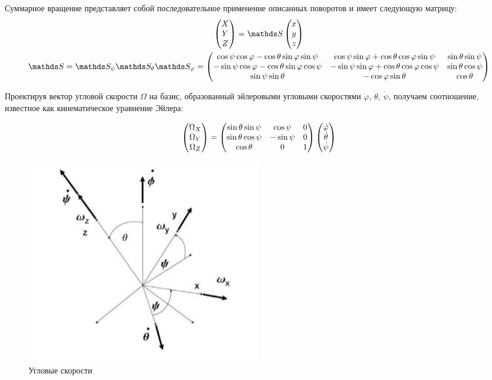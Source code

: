 Суммарное вращение представляет собой последовательное применение описанных поворотов и имеет следующую матрицу: 
\begin{gather}
\begin{pmatrix}
X \\
Y \\
Z
\end{pmatrix} = 
\bbS 
\begin{pmatrix}
x \\
y \\
z
\end{pmatrix} \notag \\
\bbS = \bbS_\psi \bbS_\theta \bbS_\varphi = 
\begin{pmatrix}
\cos \psi \cos \varphi - \cos \theta \sin \varphi \sin \psi & \cos \psi \sin \varphi + \cos \theta \cos \varphi \sin \psi & \sin \theta \sin \psi \\
- \sin \psi \cos \varphi - \cos \theta \sin \varphi \cos \psi & - \sin \psi \sin \varphi + \cos \theta \cos \varphi \cos \psi & \sin \theta \cos \psi \\
\sin \psi \sin \theta & - \cos \varphi \sin \theta & \cos \theta 
\end{pmatrix} \notag
\end{gather}

Проектируя вектор угловой скорости $\Omega$ на базис, образованный эйлеровыми угловыми скоростями $\dot{\varphi}$, $\dot{\theta}$, $\dot{\psi}$, получаем соотношение, известное как кинематическое уравнение Эйлера:

\begin{gather}
\begin{pmatrix}
\Omega_X \\
\Omega_Y \\
\Omega_Z
\end{pmatrix} =
\begin{pmatrix}
\sin \theta \sin \psi & \cos \psi & 0 \\
\sin \theta \cos \psi & - \sin \psi & 0 \\
\cos \theta & 0 & 1
\end{pmatrix}
\begin{pmatrix}
\dot{\varphi} \\
\dot{\theta} \\
\dot{\psi}
\end{pmatrix} \notag
\end{gather}

\begin{figure}
  \centering
	\includegraphics[width=0.5\textwidth]{../pictures/AngularVelocities.jpg}
	\caption{Угловые скорости}
	\label{fig:AngularVelocities}
\end{figure}

